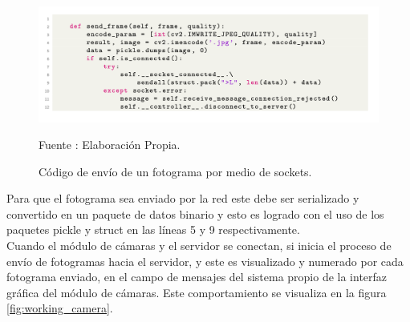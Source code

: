 
\begin{figure}[H]
    \begin{center}
        \includegraphics[width=16cm]{img/capitulo_5/code1.png}
        \caption{Código de envío de un fotograma por medio de sockets.}
        Fuente : Elaboración Propia.
        \label{fig:socket_client}
    \end{center}
\end{figure}

Para que el fotograma sea enviado por la red este debe ser serializado y convertido en un paquete de datos binario y esto es logrado con el uso de los paquetes pickle y struct en las líneas 5 y 9 respectivamente.\\

Cuando el módulo de cámaras y el servidor se conectan, si inicia el proceso de envío de fotogramas hacia el servidor, y este es visualizado y numerado por cada fotograma enviado, en el campo de mensajes del sistema propio de la interfaz gráfica del módulo de cámaras. Este comportamiento se visualiza en la figura \ref{fig:working_camera}.

